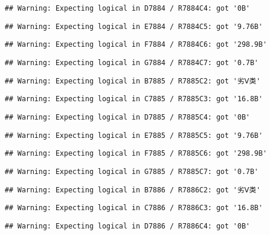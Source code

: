 \documentclass[
]{article}
\begin{document}
\begin{verbatim}
## Warning: Expecting logical in D7884 / R7884C4: got '0B'
\end{verbatim}

\begin{verbatim}
## Warning: Expecting logical in E7884 / R7884C5: got '9.76B'
\end{verbatim}

\begin{verbatim}
## Warning: Expecting logical in F7884 / R7884C6: got '298.9B'
\end{verbatim}

\begin{verbatim}
## Warning: Expecting logical in G7884 / R7884C7: got '0.7B'
\end{verbatim}

\begin{verbatim}
## Warning: Expecting logical in B7885 / R7885C2: got '劣Ⅴ类'
\end{verbatim}

\begin{verbatim}
## Warning: Expecting logical in C7885 / R7885C3: got '16.8B'
\end{verbatim}

\begin{verbatim}
## Warning: Expecting logical in D7885 / R7885C4: got '0B'
\end{verbatim}

\begin{verbatim}
## Warning: Expecting logical in E7885 / R7885C5: got '9.76B'
\end{verbatim}

\begin{verbatim}
## Warning: Expecting logical in F7885 / R7885C6: got '298.9B'
\end{verbatim}

\begin{verbatim}
## Warning: Expecting logical in G7885 / R7885C7: got '0.7B'
\end{verbatim}

\begin{verbatim}
## Warning: Expecting logical in B7886 / R7886C2: got '劣Ⅴ类'
\end{verbatim}

\begin{verbatim}
## Warning: Expecting logical in C7886 / R7886C3: got '16.8B'
\end{verbatim}

\begin{verbatim}
## Warning: Expecting logical in D7886 / R7886C4: got '0B'
\end{verbatim}
\end{document}

